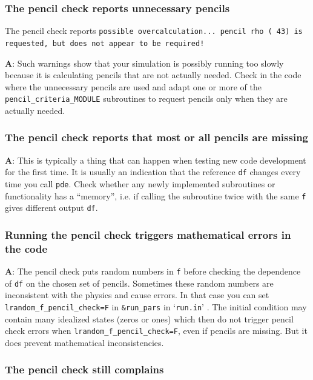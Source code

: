 \documentclass[\mydriver,12pt,twoside,notitlepage,a4paper]{article}
\makeatletter
\newcommand{\code}[1]{\texttt{#1}}
\newcommand{\file}[2][]{%
  \def\index@{#1}%
  `\texttt{#2}'%
  \ifx\index@\@empty\index[file]{#2@\texttt{#2}}%
  \else\index[file]{#1@\texttt{#1}}%
  \fi%
}
\makeatother
\begin{document}
\subsubsection{The pencil check reports unnecessary pencils}

The pencil check reports
\code{possible overcalculation... pencil rho (  43) is requested, but does not
appear to be required!}

\medskip

{\bf A}: Such warnings show that your simulation is possibly running too slowly
because it is calculating pencils that are not actually needed. Check in the
code where the unnecessary pencils are used and adapt one or more of the
\code{pencil_criteria_MODULE} subroutines to request pencils only when they are
actually needed.

\subsubsection{The pencil check reports that most or all pencils are missing}

\medskip

{\bf A}: This is typically a thing that can happen when testing new code
development for the first time. It is usually an indication that the reference
\code{df} changes every time you call \code{pde}. Check whether any newly
implemented subroutines or functionality has a ``memory'', i.e. if calling the
subroutine twice with the same \code{f} gives different output \code{df}.

\subsubsection{Running the pencil check triggers mathematical errors in the code}

{\bf A}: The pencil check puts random numbers in \code{f} before checking the
dependence of \code{df} on the chosen set of pencils. Sometimes these random
numbers are inconsistent with the physics and cause errors. In that case you
can set \code{lrandom_f_pencil_check=F} in \code{\&run_pars} in \file{run.in}.
The initial condition may contain many idealized states (zeros or ones) which
then do not trigger pencil check errors when \code{lrandom_f_pencil_check=F},
even if pencils are missing. But it does prevent mathematical inconsistencies.

\subsubsection{The pencil check still complains}
\end{document}
